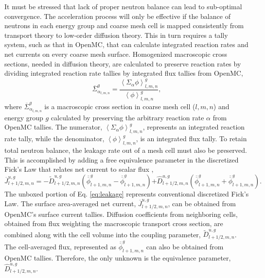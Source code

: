 \documentclass{ansconf}
\begin{document}
It must be stressed that lack of proper neutron balance can lead to sub-optimal
convergence. The acceleration process will only be effective if the balance of
neutrons in each energy group and coarse mesh cell is mapped consistently from
transport theory to low-order diffusion theory. This in turn requires a tally
system, such as that in OpenMC, that can calculate integrated reaction rates and
net currents on every coarse mesh surface. Homogenized macroscopic cross
sections, needed in diffusion theory, are calculated to preserve reaction rates
by dividing integrated reaction rate tallies by integrated flux tallies from
OpenMC,
\begin{equation}
  \label{eq:macro_xs}
  \overline{\Sigma}_{\alpha_{l,m,n}}^{g} = \frac{\left\langle
    \Sigma_{\alpha}\phi \right\rangle_{l,m,n}^{g}} {\left\langle\phi
    \right\rangle_{l,m,n}^{g}},
\end{equation}
where $\overline{\Sigma}_{\alpha_{l,m,n}}^{g}$ is a macroscopic cross section in
coarse mesh cell ($l,m,n$) and energy group $g$ calculated by preserving the
arbitrary reaction rate $\alpha$ from OpenMC tallies. The numerator,
$\left\langle\Sigma_{\alpha}\phi \right\rangle_{l,m,n}^{g}$, represents an
integrated reaction rate tally, while the denominator,
$\left\langle\phi\right\rangle_{l,m,n}^{g}$, is an integrated flux tally.  To
retain total neutron balance, the leakage rate out of a mesh cell must also be
preserved.  This is accomplished by adding a free equivalence parameter in the
discretized Fick's Law that relates net current to scalar flux
\cite{physor-smith-2002},
\begin{equation}
  \label{eq:leakage}
  \overline{J}_{l+1/2,m,n}^{u,g} = -\tilde{D}_{l+1/2,m,n}^{u,g}
  \left(\overline{\overline{\phi}}_{l+1,m,n}^{g} -
  \overline{\overline{\phi}}_{l+1,m,n}^{g} \right) \boxed{+
    \hat{D}_{l+1/2,m,n}^{u,g} \left(\overline{\overline{\phi}}_{l+1,m,n}^{g} +
    \overline{\overline{\phi}}_{l+1,m,n}^{g} \right)}.
\end{equation}
The unboxed portion of Eq. \eqref{eq:leakage} represents conventional
discretized Fick's Law. The surface area-averaged net current,
$\overline{J}_{l+1/2,m,n}^{u,g}$, can be obtained from OpenMC's surface current
tallies. Diffusion coefficients from neighboring cells, obtained from flux
weighting the macroscopic transport cross section, are combined along with the
cell volume into the coupling parameter, $\tilde{D}_{l+1/2,m,n}^{u,g}$. The
cell-averaged flux, represented as $\overline{\overline{\phi}}_{l+1,m,n}^{g}$
can also be obtained from OpenMC tallies.  Therefore, the only unknown is the
equivalence parameter, $\hat{D}_{l+1/2,m,n}^{u,g}$.
\end{document}
